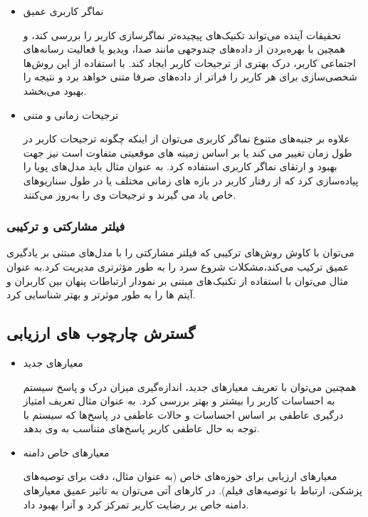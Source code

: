 \begin{itemize}
\item
 نماگر کاربری عمیق

 تحقیقات آینده می‌تواند تکنیک‌های پیچیده‌تر نماگر‌سازی کاربر را بررسی کند، و همچین با بهره‌بردن از داده‌های چندوجهی مانند صدا، ویدیو یا فعالیت رسانه‌های اجتماعی کاربر، درک بهتری از ترجیحات کاربر ایجاد کند.
با استفاده از این روش‌ها شخصی‌سازی برای هر کاربر را فراتر از داده‌های صرفا متنی خواهد برد و نتیجه را بهبود می‌بخشد.
\item
 ترجیحات زمانی و متنی

 علاوه بر جنبه‌های متنوع نماگر ‌کاربری می‌توان از اینکه چگونه ترجیحات کاربر در طول زمان تغییر می کند یا بر اساس زمینه های موقعیتی متفاوت است نیز جهت بهبود و ارتقای نماگر کاربری استفاده کرد.
به عنوان مثال باید مدل‌های پویا را پیاده‌سازی کرد که از رفتار کاربر در بازه های زمانی مختلف یا در طول سناریوهای خاص یاد می گیرند و ترجیحات وی را به‌روز می‌کنند.
\end{itemize}

\subsubsection{فیلتر مشارکتی و ترکیبی}
می‌توان با کاوش روش‌های ترکیبی که فیلتر مشارکتی را با مدل‌های مبتنی بر یادگیری عمیق ترکیب می‌کند،مشکلات شروع سرد را به طور مؤثرتری مدیریت کرد.به عنوان مثال می‌توان با استفاده از تکنیک های مبتنی بر نمودار ارتباطات پنهان بین کاربران و آیتم ها را به طور موثرتر و بهتر شناسایی کرد.


\subsection{گسترش چارچوب های ارزیابی}

\begin{itemize}
\item
معیارهای جدید

همچنین می‌توان با تعریف معیارهای جدید، اندازه‌گیری میزان درک و پاسخ سیستم به احساسات کاربر را بیشتر و بهتر بررسی کرد. به عنوان مثال تعریف امتیاز درگیری عاطفی بر اساس احساسات و حالات عاطفی در پاسخ‌ها که سیستم با توجه به حال عاطفی کاربر پاسخ‌های متناسب به وی بدهد.
\item
 معیارهای خاص دامنه

 معیارهای ارزیابی برای حوزه‌های خاص (به عنوان مثال، دقت برای توصیه‌های پزشکی، ارتباط با توصیه‌های فیلم). در کارهای آتی می‌توان به تاثیر عمیق معیارهای دامنه خاص بر رضایت کاربر تمرکز کرد و آنرا بهبود داد.
\end{itemize}

